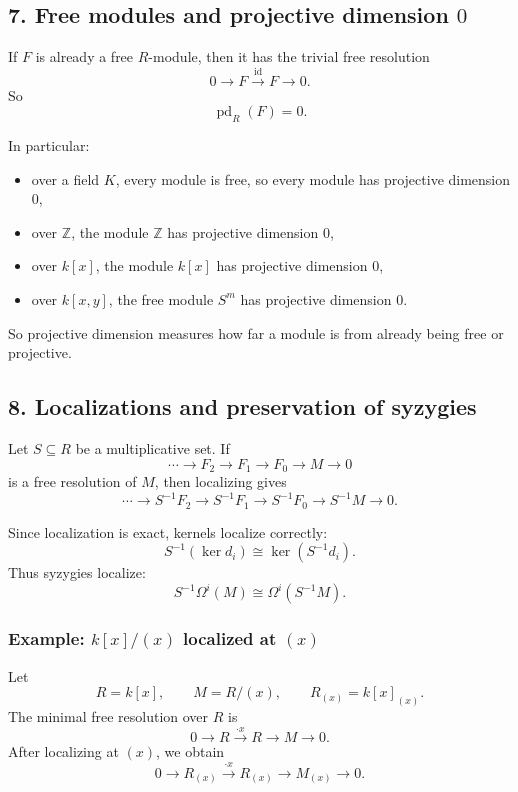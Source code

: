 \documentclass[12pt,a4paper]{article}
\theoremstyle{notespace}
\theoremstyle{definition}
\begin{document}
\subsection{7. Free modules and projective dimension \(0\)}

If \(F\) is already a free \(R\)-module, then it has the trivial free resolution
\[
0 \longrightarrow F \xrightarrow{\operatorname{id}} F \longrightarrow 0.
\]
So
\[
\operatorname{pd}_R(F)=0.
\]

In particular:
\begin{itemize}
	\item over a field \(K\), every module is free, so every module has projective dimension \(0\),
	\item over \(\mathbb Z\), the module \(\mathbb Z\) has projective dimension \(0\),
	\item over \(k[x]\), the module \(k[x]\) has projective dimension \(0\),
	\item over \(k[x,y]\), the free module \(S^m\) has projective dimension \(0\).
\end{itemize}

So projective dimension measures how far a module is from already being free or projective.

\subsection{8. Localizations and preservation of syzygies}

Let \(S\subseteq R\) be a multiplicative set.
If
\[
\cdots \longrightarrow F_2 \longrightarrow F_1 \longrightarrow F_0 \longrightarrow M \longrightarrow 0
\]
is a free resolution of \(M\), then localizing gives
\[
\cdots \longrightarrow S^{-1}F_2 \longrightarrow S^{-1}F_1 \longrightarrow S^{-1}F_0 \longrightarrow S^{-1}M \longrightarrow 0.
\]

Since localization is exact, kernels localize correctly:
\[
S^{-1}(\ker d_i)\cong \ker(S^{-1}d_i).
\]
Thus syzygies localize:
\[
S^{-1}\Omega^i(M)\cong \Omega^i(S^{-1}M).
\]

\subsubsection*{Example: \(k[x]/(x)\) localized at \((x)\)}

Let
\[
R=k[x],\qquad M=R/(x),\qquad R_{(x)}=k[x]_{(x)}.
\]
The minimal free resolution over \(R\) is
\[
0 \longrightarrow R \xrightarrow{\cdot x} R \longrightarrow M \longrightarrow 0.
\]
After localizing at \((x)\), we obtain
\[
0 \longrightarrow R_{(x)} \xrightarrow{\cdot x} R_{(x)} \longrightarrow M_{(x)} \longrightarrow 0.
\]
\end{document}
